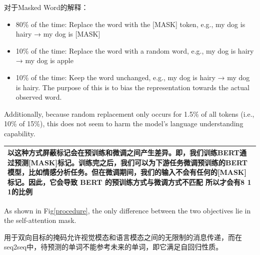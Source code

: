 \documentclass{article}
\begin{document}
\begin{sloppypar}
      对于Masked Word的解释\cite{devlin2019bert}：
      \begin{itemize}
            \item 80\% of the time: Replace the word with the [MASK] token, e.g., my dog is hairy → my dog is [MASK]
            \item 10\% of the time: Replace the word with a random word, e.g., my dog is hairy → my dog is apple
            \item 10\% of the time: Keep the word unchanged, e.g., my dog is hairy → my dog is hairy. The purpose of this is to bias the representation towards the actual observed word.
      \end{itemize}
      Additionally, because random replacement only occurs for 1.5\% of all tokens (i.e., 10\% of 15\%), this does not seem to harm the model’s language understanding capability.\cite{devlin2019bert}
      \begin{table}[!htbp]
            \renewcommand\arraystretch{2}

            \centering
            \begin{tabularx}{\textwidth}{|X|}
                  \hline

                  \indent 以这种方式屏蔽标记会在预训练和微调之间产生差异。即，我们训练BERT通过预测[MASK]标记。训练完之后，我们可以为下游任务微调预训练的BERT模型，比如情感分析任务。但在微调期间，我们的输入不会有任何的[MASK]标记。因此，它会导致 BERT 的预训练方式与微调方式不匹配
                  所以才会有8 1 1的比例 \\
                  \hline
            \end{tabularx}%
            \label{tab:addlabel}%

      \end{table}%



      As shown in Fig\ref{procedure}, the only difference between the two objectives lie in the self-attention mask.

      用于双向目标的掩码允许视觉模态和语言模态之间的无限制的消息传递，而在seq2seq中，待预测的单词不能参考未来的单词，即它满足自回归性质。

      \begin{table}[!htbp]
            \renewcommand\arraystretch{2}


\end{table}
\end{sloppypar}
\end{document}
